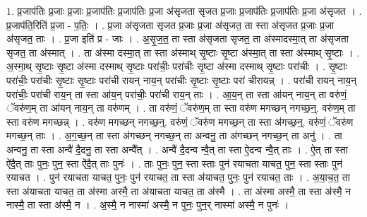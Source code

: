 \documentclass[17pt]{extarticle}
\begin{document}
1. प्र॒जाप॑तिः प्र॒जाः प्र॒जाः प्र॒जाप॑तिः प्र॒जाप॑तिः प्र॒जा अ॑सृजता सृजत प्र॒जाः प्र॒जाप॑तिः प्र॒जाप॑तिः प्र॒जा अ॑सृजत । . प्र॒जाप॑ति॒रिति॑ प्र॒जा - प॒तिः॒ । . प्र॒जा अ॑सृजता सृजत प्र॒जाः प्र॒जा अ॑सृजत॒ ता स्ता अ॑सृजत प्र॒जाः प्र॒जा अ॑सृजत॒ ताः । . प्र॒जा इति॑ प्र - जाः । . अ॒सृ॒ज॒त॒ ता स्ता अ॑सृजता सृजत॒ ता अ॑स्मादस्मा॒त् ता अ॑सृजता सृजत॒ ता अ॑स्मात् । . ता अ॑स्मा दस्मा॒त् ता स्ता अ॑स्माथ् सृ॒ष्टाः सृ॒ष्टा अ॑स्मा॒त् ता स्ता अ॑स्माथ् सृ॒ष्टाः । . अ॒स्मा॒थ् सृ॒ष्टाः सृ॒ष्टा अ॑स्मा दस्माथ् सृ॒ष्टाः परा॑चीः॒ परा॑चीः सृ॒ष्टा अ॑स्मा दस्माथ् सृ॒ष्टाः परा॑चीः । . सृ॒ष्टाः परा॑चीः॒ परा॑चीः सृ॒ष्टाः सृ॒ष्टाः परा॑ची रायन् नाय॒न् परा॑चीः सृ॒ष्टाः सृ॒ष्टाः परा॑ चीरायन्न् । . परा॑ची रायन् नाय॒न् परा॑चीः॒ परा॑ची राय॒न् ता स्ता आ॑य॒न् परा॑चीः॒ परा॑ची राय॒न् ताः । . आ॒य॒न् ता स्ता आ॑यन् नाय॒न् ता वरु॑णं॒ ॅवरु॑ण॒म् ता आ॑यन् नाय॒न् ता वरु॑णम् । . ता वरु॑णं॒ ॅवरु॑ण॒म् ता स्ता वरु॑ण मगच्छन् नगच्छ॒न्॒. वरु॑ण॒म् ता स्ता वरु॑ण मगच्छन्न् । . वरु॑ण मगच्छन् नगच्छ॒न्॒. वरु॑णं॒ ॅवरु॑ण मगच्छ॒न् ता स्ता अ॑गच्छ॒न्॒. वरु॑णं॒ ॅवरु॑ण मगच्छ॒न् ताः । . अ॒ग॒च्छ॒न् ता स्ता अ॑गच्छन् नगच्छ॒न् ता अन्वनु॒ ता अ॑गच्छन् नगच्छ॒न् ता अनु॑ । . ता अन्वनु॒ ता स्ता अन्वै॑ दै॒दनु॒ ता स्ता अन्वै᳚त् । . अन्वै॑ दै॒दन्व न्वै॒त् ता स्ता ऐ॒दन्व न्वै॒त् ताः । . ऐ॒त् ता स्ता ऐ॑दै॒त् ताः पुनः॒ पुन॒ स्ता ऐ॑दै॒त् ताः पुनः॑ । . ताः पुनः॒ पुन॒ स्ता स्ताः पुन॑ रयाचता याचत॒ पुन॒ स्ता स्ताः पुन॑ रयाचत । . पुन॑ रयाचता याचत॒ पुनः॒ पुन॑ रयाचत॒ ता स्ता अ॑याचत॒ पुनः॒ पुन॑ रयाचत॒ ताः । . अ॒या॒च॒त॒ ता स्ता अ॑याचता याचत॒ ता अ॑स्मा अस्मै॒ ता अ॑याचता याचत॒ ता अ॑स्मै । . ता अ॑स्मा अस्मै॒ ता स्ता अ॑स्मै॒ न नास्मै॒ ता स्ता अ॑स्मै॒ न । . अ॒स्मै॒ न नास्मा॑ अस्मै॒ न पुनः॒ पुन॒र् नास्मा॑ अस्मै॒ न पुनः॑ । \newline
\end{document}
